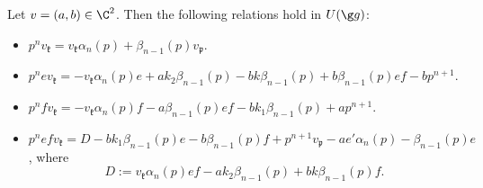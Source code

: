 \documentclass[11pt]{amsart}
\begin{document}
\begin{lem}\label{Second part}
Let $v=(a,b)\in\C^2$. Then the following relations hold in $U(\g g)$:
\begin{itemize}
\item[\rm (i)]
$p^nv_{\mathfrak k}=v_{\mathfrak k}\alpha_{n}(p)+\beta_{n-1}(p)v_{\mathfrak p}$.
\item[\rm (ii)]
$p^nev_{\mathfrak k}=-v_{\mathfrak k}\alpha_{n}(p)e+ak_2\beta_{n-1}(p)-bk\beta_{n-1}(p)+b\beta_{n-1}(p)ef-bp^{n+1}$.

\item[\rm (iii)]
$ p^nfv_{\mathfrak k}=-v_{\mathfrak k}\alpha_{n}(p)f-a\beta_{n-1}(p)ef-bk_1\beta_{n-1}(p)+ap^{n+1}$.
\item[\rm (iv)]
$
p^nefv_{\mathfrak k}=D-bk_1\beta_{n-1}(p)e-b\beta_{n-1}(p)f+p^{n+1}v_{\mathfrak p}-ae'\alpha_{n}(p)-\beta_{n-1}(p)e$, 
where \[
D:=v_{\mathfrak k}\alpha_{n}(p)ef-ak_2\beta_{n-1}(p)+bk\beta_{n-1}(p)f.
\]
\end{itemize}
\end{lem}
\end{document}
